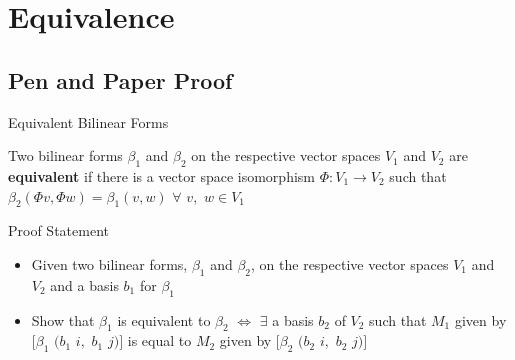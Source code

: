 \documentclass[svgnames]{beamer}
\begin{document}
\section{Equivalence}
\subsection{Pen and Paper Proof}
\begin{frame}{Equivalent Bilinear Forms}
\begin{Definition}
Two bilinear forms $\beta_1$ and $\beta_2$ on the respective vector spaces $V_1$ and $V_2$ are \textbf{equivalent} if there is a vector space isomorphism $\Phi:V_1\to V_2$ such that $\beta_2 (\Phi v,\Phi w)= \beta_1 (v,w)$ $\forall$ $v,$ $w\in V_1$
\end{Definition}
\pause
\begin{block}{Proof Statement}
\begin{itemize}
    \item Given two bilinear forms, $\beta_1$ and $\beta_2$, on the respective vector spaces $V_1$ and $V_2$ and a basis $b_1$ for $\beta _1$
    \item Show that $\beta_1$ is equivalent to $\beta_2$ $\iff$ $\exists$ a basis $b_2$ of $V_2$ such that $M_1$ given by $[\beta_1$ $(b_1$ $i,$ $b_1$ $j)]$ is equal to $M_2$ given by $[\beta_2$ $(b_2$ $i,$ $b_2$ $j)]$

\end{itemize}
\end{block}
\end{frame}
\end{document}
